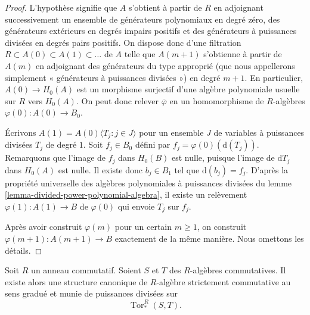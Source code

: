 \begin{proof}
L'hypothèse signifie que $A$ s'obtient à partir de $R$ en adjoignant successivement
un ensemble de générateurs polynomiaux en degré zéro, des générateurs extérieurs en
degrés impairs positifs et des générateurs à puissances divisées
en degrés pairs positifs. On dispose donc d'une filtration
$R \subset A(0) \subset A(1) \subset\ldots$
de $A$ telle que $A(m + 1)$ s'obtienne à partir de $A(m)$ en adjoignant
des générateurs du type approprié (que nous appellerons simplement «
générateurs à puissances divisées ») en degré $m + 1$.
En particulier, $A(0) \to H_0(A)$ est un morphisme surjectif d'une algèbre
polynomiale usuelle sur $R$ vers $H_0(A)$. On peut donc relever $\overline{\varphi}$
en un homomorphisme de $R$-algèbres $\varphi(0) : A(0) \to B_0$.

\medskip\noindent
Écrivons $A(1) = A(0)\langle T_j:j\in J\rangle$ pour un
ensemble $J$ de variables à puissances divisées $T_j$ de degré $1$. Soit $f_j \in B_0$
défini par $f_j = \varphi(0)(\text{d}(T_j))$. Remarquons que l'image de $f_j$
dans $H_0(B)$ est nulle, puisque l'image de $\text{d}T_j$ dans $H_0(A)$ est
nulle. Il existe donc $b_j \in B_1$ tel que $\text{d}(b_j) = f_j$.
D'après la propriété universelle des algèbres polynomiales à puissances divisées du
lemme \ref{lemma-divided-power-polynomial-algebra}, il
existe un relèvement $\varphi(1) : A(1) \to B$ de $\varphi(0)$
qui envoie $T_j$ sur $f_j$.

\medskip\noindent
Après avoir construit $\varphi(m)$ pour un certain $m \geq 1$, on construit
$\varphi(m + 1) : A(m + 1) \to B$ exactement de la même manière.
Nous omettons les détails.
\end{proof}

\begin{lemma}
\label{lemma-divided-powers-on-tor}
Soit $R$ un anneau commutatif. Soient $S$ et $T$ des $R$-algèbres
commutatives. Il existe alors
une structure canonique de $R$-algèbre strictement commutative au sens gradué et munie de puissances divisées sur
$$
\operatorname{Tor}_*^R(S, T).
$$
\end{lemma}

